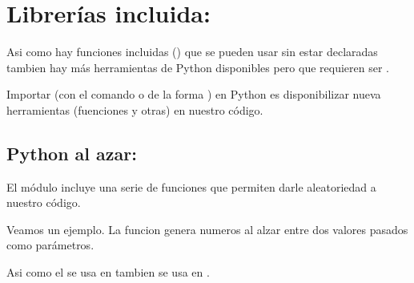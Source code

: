\documentclass[a4paper,12pt,spanish]{sphinxmanual}
\begin{document}
\sphinxstepscope


\chapter{Librerías incluida: }
\label{\detokenize{random:librerias-incluida-random}}\label{\detokenize{random::doc}}
\sphinxAtStartPar
Asi como hay funciones incluidas () que se pueden usar sin
estar declaradas tambien hay más herramientas de Python disponibles pero
que requieren ser .

\sphinxAtStartPar
Importar (con el comando  o de la forma )
en Python es disponibilizar nueva herramientas (fuenciones y otras) en
nuestro código.


\section{Python al azar: }
\label{\detokenize{random:python-al-azar-random}}
\sphinxAtStartPar
El módulo  incluye una serie de funciones que permiten
darle aleatoriedad a nuestro código.

\sphinxAtStartPar
Veamos un ejemplo. La funcion  genera numeros al alzar
entre dos valores pasados como parámetros.

\begin{sphinxVerbatim}[commandchars=\\\{\}]
   

   

 
   
\end{sphinxVerbatim}

\sphinxAtStartPar
Asi como el  se usa en  tambien se usa
en .
\end{document}
